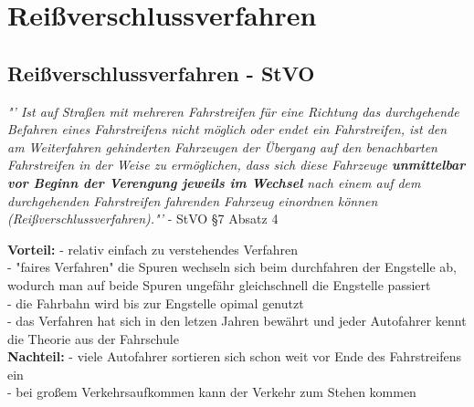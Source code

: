 \chapter{Reißverschlussverfahren}
\section{Reißverschlussverfahren - StVO}
\begin{center}
	\textit{"' Ist auf Straßen mit mehreren Fahrstreifen für eine Richtung das durchgehende Befahren eines Fahrstreifens nicht möglich oder endet ein Fahrstreifen, ist den am Weiterfahren gehinderten Fahrzeugen der Übergang auf den benachbarten Fahrstreifen in der Weise zu ermöglichen, dass sich diese Fahrzeuge \textbf{unmittelbar vor Beginn der Verengung jeweils im Wechsel} nach einem auf dem durchgehenden Fahrstreifen fahrenden Fahrzeug einordnen können (Reißverschlussverfahren)."'} - StVO \S 7 Absatz 4
\end{center}
\textbf{Vorteil:} - relativ einfach zu verstehendes Verfahren\\
- "faires Verfahren" die Spuren wechseln sich beim durchfahren der Engstelle ab, wodurch man auf beide Spuren ungefähr gleichschnell die Engstelle passiert\\
- die Fahrbahn wird bis zur Engstelle opimal genutzt\\
- das Verfahren hat sich in den letzen Jahren bewährt und jeder Autofahrer kennt die Theorie aus der Fahrschule\\
\textbf{Nachteil:} - viele Autofahrer sortieren sich schon weit vor Ende des Fahrstreifens ein\\
- bei großem Verkehrsaufkommen kann der Verkehr zum Stehen kommen\\

